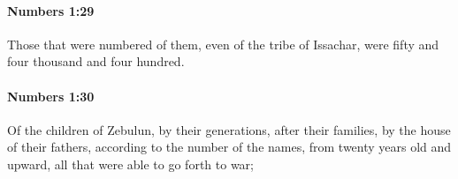 		\paragraph{Numbers 1:29} %
			\label{NUMBERS-1-29}

			Those that were numbered of them, even of the tribe of Issachar, were fifty and four thousand and four hundred.


		\paragraph{Numbers 1:30} %
			\label{NUMBERS-1-30}

			Of the children of Zebulun, by their generations, after their families, by the house of their fathers, according to the number of the names, from twenty years old and upward, all that were able to go forth to war;


